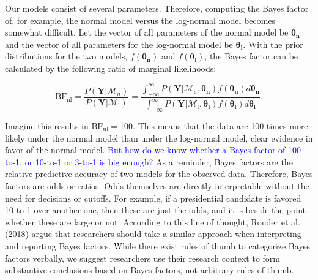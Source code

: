 \documentclass[
  english,
  doc,floatsintext]{apa6}
\begin{document}
Our models consist of several parameters. Therefore, computing the Bayes factor of, for example, the normal model versus the log-normal model becomes somewhat difficult. Let the vector of all parameters of the normal model be \(\bm{\theta_\text{n}}\) and the vector of all parameters for the log-normal model be \(\bm{\theta_{\text{l}}}\). With the prior distributions for the two models, \(f(\bm{\theta_\text{n}})\) and \(f(\bm{\theta_\text{l}})\), the Bayes factor can be calculated by the following ratio of marginal likelihoods:

\begin{equation}
\text{BF}_{\text{nl}} = \frac{P(\bm{Y} | \mathcal{M}_n)}{P(\bm{Y} | \mathcal{M}_{\text{l}})} = \frac{\int_{-\infty}^{\infty}P(\bm{Y} | \mathcal{M}_\text{n}, \bm{\theta_{\text{n}}})f(\bm{\theta_{\text{n}}})d\bm{\theta_{\text{n}}}}{\int_{-\infty}^{\infty}P(\bm{Y} | \mathcal{M}_\text{l}, \bm{\theta_{\text{l}}})f(\bm{\theta_{\text{l}}})d\bm{\theta_{\text{l}}}}. 
\end{equation}

Imagine this results in \(\text{BF}_{\text{nl}} = 100\). This means that the data are 100 times more likely under the normal model than under the log-normal model, clear evidence in favor of the normal model. \textcolor{blue}{But how do we know whether a Bayes factor of 100-to-1, or 10-to-1 or 3-to-1 is big enough?} As a reminder, Bayes factors are the relative predictive accuracy of two models for the observed data. Therefore, Bayes factors are odds or ratios. Odds themselves are directly interpretable without the need for decisions or cutoffs. For example, if a presidential candidate is favored 10-to-1 over another one, then these are just the odds, and it is beside the point whether these are large or not. According to this line of thought, Rouder et al. (2018) argue that researchers should take a similar approach when interpreting and reporting Bayes factors. While there exist rules of thumb to categorize Bayes factors verbally, we suggest researchers use their research context to form substantive conclusions based on Bayes factors, not arbitrary rules of thumb.
\end{document}
